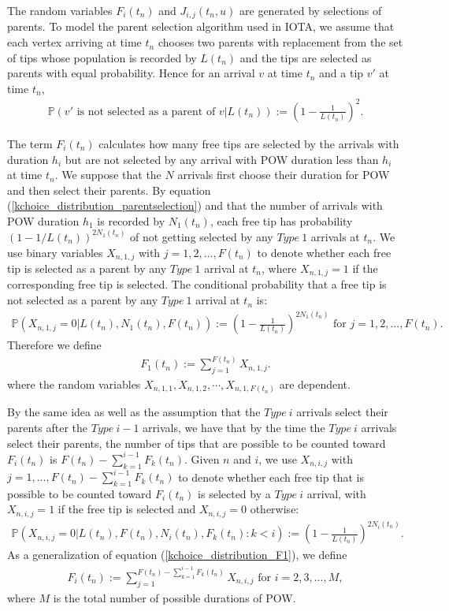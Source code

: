\documentclass[12pt]{article}
\def\P{\mathbb{P}}
\numberwithin{equation}{section}  %
\begin{document}
The random variables $F_i(t_n)$ and $J_{i,j}(t_n,u)$ are generated by selections of parents. To model the parent selection algorithm used in IOTA, we assume that each vertex arriving at time $t_n$ chooses two parents with replacement from the set of tips whose population is recorded by $L(t_n)$ and the tips are selected as parents with equal probability. Hence for an arrival $v$ at time $t_n$ and a tip $v'$ at time $t_n$, 
\begin{align} 
\P(v' \text{ is not selected as a parent of }v|L(t_n)):= \left(1-\frac{1}{L(t_n)} \right)^2. \label{kchoice_distribution_parentselection}
\end{align} 

The term $F_i(t_n)$ calculates how many free tips are selected by the arrivals with duration $h_i$ but are not selected by any arrival with POW duration less than $h_i$ at time $t_n$. We suppose that the $N$ arrivals first choose their duration for POW and then select their parents. By equation (\ref{kchoice_distribution_parentselection}) and that the number of arrivals with POW duration $h_1$ is recorded by $N_1(t_n)$, each free tip has probability $(1-1/L(t_n))^{2N_1(t_n)}$ of not getting selected by any {$Type\ 1$} arrivals at $t_n$. We use binary variables $X_{n,1,j}$ with $j=1,2,...,F(t_n)$ to denote whether each free tip is selected as a parent by any {$Type\ 1$} arrival at $t_n$, where $X_{n,1,j}=1$ if the corresponding free tip is selected. The conditional probability that a free tip is not selected as a parent by any {$Type\ 1$} arrival at $t_n$ is:
\begin{align*} 
\P(X_{n,1,j}=0|L(t_n),N_1(t_n),F(t_n) ):=\left(1 - \frac{1}{L(t_n)} \right)^{2 N_1(t_n)} \text{ for } j=1,2,...,F(t_n).
\end{align*}
Therefore we define
\begin{align}
F_1(t_n) :=\sum_{j=1}^{F(t_n)} X_{n,1,j}.  \label{kchoice_distribution_F1}
\end{align}
where the random variables $X_{n,1,1},X_{n,1,2},\cdots,X_{n,1,F(t_n)}$ are dependent. 

By the same idea as well as the assumption that the {$Type\ i$} arrivals select their parents after the {$Type\ i-1$} arrivals, we have that by the time the {$Type\ i$} arrivals select their parents, the number of tips that are possible to be counted toward $F_i(t_n)$ is $F(t_n)-\sum _{k=1}^{i-1}F_k(t_n)$. Given $n$ and $i$, we use $X_{n,i,j}$ with $j=1,...,F(t_n)-\sum_{k=1}^{i-1}F_k(t_n)$ to denote whether each free tip that is possible to be counted toward $F_i(t_n)$ is selected by a {$Type\ i$} arrival, with $X_{n,i,j}=1$ if the free tip is selected and $X_{n,i,j}=0$ otherwise: 
\begin{align} 
\P(X_{n,i,j}=0|L(t_n),F(t_n),N_i(t_n), F_k(t_n):k< i):=\left(1 - \frac{1}{L(t_n)}\right)^{2 N_i(t_n)}. \label{kchoice_distribution_Fi}
\end{align}
As a generalization of equation (\ref{kchoice_distribution_F1}), we define
\begin{align}
F_i(t_n) := \sum_{j=1}^{F(t_n)-\sum_{k=1}^{i-1}F_k(t_n)} X_{n,i,j} \text{ for } i=2,3,...,M,\label{kchoice_distribution_Fi1}
\end{align}
where $M$ is the total number of possible durations of POW.
\end{document}
